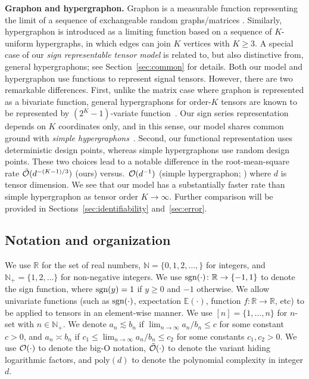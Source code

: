 \documentclass[twoside,11pt]{article}
\theoremstyle{definition}
\def\sign{\textup{sgn}}
\begin{document}
{\bf Graphon and hypergraphon.} Graphon is a measurable function representing the limit of a sequence of exchangeable random graphs/matrices \citep{klopp2017oracle,gao2015rate,chan2014consistent}. Similarly, hypergraphon \citep{zhao2015hypergraph,lovasz2012large} is introduced as a limiting function based on a sequence of $K$-uniform hypergraphs, in which edges can join $K$ vertices with $K\geq 3.$ A special case of our \emph{sign representable tensor model} is related to, but also distinctive from, general hypergraphons; see Section~\ref{sec:common} for details. Both our model and hypergraphon use functions to represent signal tensors. However, there are two remarkable differences. First, unlike the matrix case where graphon is represented as a bivariate function, general hypergraphons for order-$K$  tensors are known to be represented by $(2^K-1)$-variate function~\citep{zhao2015hypergraph}. Our sign series representation depends on
$K$ coordinates only, and in this sense, our model shares common ground with \emph{simple hypergraphons}~\citep{balasubramanian2021nonparametric}. Second, our functional representation uses deterministic design points, whereas simple hypergraphons use random design points. These two choices lead to a notable difference in the root-mean-square rate $\tilde{\mathcal{O}}(d^{-(K-1)/3})$ (ours) versus.\ $\mathcal{O}(d^{-1})$ (simple hypergraphon; \cite{balasubramanian2021nonparametric}) where $d$ is tensor dimension. 
We see that our model has a substantially faster rate than simple hypergraphon as tensor order $K\rightarrow\infty$. Further comparison will be provided in Sections~\ref{sec:identifiability} and~\ref{sec:error}.


\subsection{Notation and organization}
We use $\mathbb{R}$ for the set of real numbers, $\mathbb{N}=\{0,1,2,\ldots,\}$ for integers, and $\mathbb{N}_{+}=\{1,2,\ldots\}$ for non-negative integers. 
We use $\sign(\cdot)\colon \mathbb{R}\to\{-1,1\}$ to denote the sign function, where $\sign(y)=1$ if $y\geq 0$ and $-1$ otherwise. We allow univariate functions (such as $\sign(\cdot)$, expectation $\mathbb{E}(\cdot)$, function $f\colon \mathbb{R}\to\mathbb{R}$, etc) to be applied to tensors in an element-wise manner. We use $[n]=\{1,\ldots,n\}$ for $n$-set with $n\in\mathbb{N}_{+}$. We denote $a_n\lesssim b_n$ if $\lim_{n\to\infty} a_n/b_n\leq c$ for some constant $c>0$, and $a_n\asymp b_n$ if $c_1\leq \lim_{n\to \infty} a_n/b_n\leq c_2$ for some constants $c_1,c_2>0$. We use $\mathcal{O}(\cdot)$ to denote the big-O notation, $\tilde {\mathcal{O}}(\cdot)$ to denote the variant hiding logarithmic factors, and $\text{poly}(d)$ to denote the polynomial complexity in integer $d$. 
\end{document}
